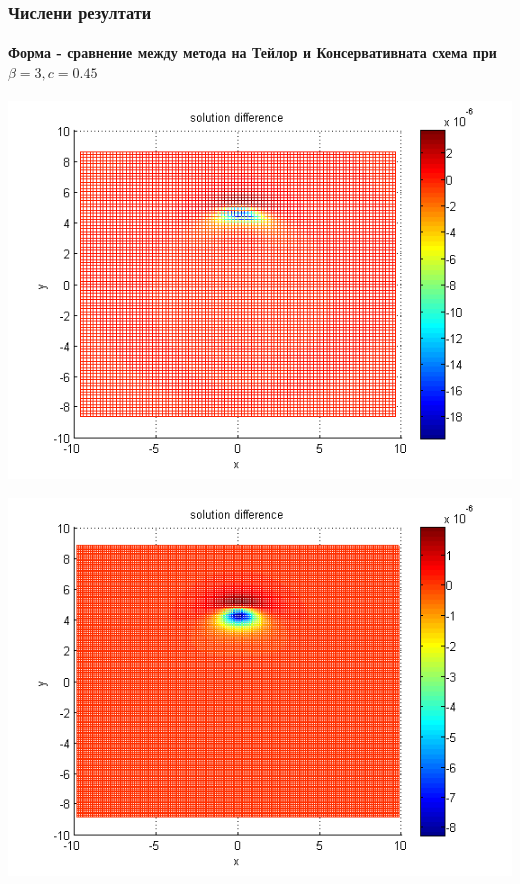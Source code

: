 \documentclass{beamer}
\begin{document}

\begin{frame}
\frametitle{Числени резултати}
\framesubtitle{Форма - сравнение между метода на Тейлор и Консервативната схема при $\beta = 3, c=0.45$}
\begin{center}\vspace{0.4cm}
	\begin{minipage}[b]{0.32\linewidth}
		 \includegraphics[width=\linewidth]{../amitans/figures/compare_30_bt3_c045_h020.png}
	\end{minipage}	
	\begin{minipage}[b]{0.32\linewidth}
		\includegraphics[width=\linewidth]{../amitans/figures/compare_30_bt3_c045_h010.png}

\end{minipage}
\end{center}
\end{frame}
\end{document}
